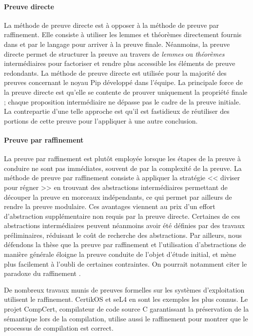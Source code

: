 			\paragraph{Preuve directe} La méthode de preuve directe est à opposer à la méthode de preuve par raffinement. Elle consiste à utiliser les lemmes et théorèmes directement fournis dans et par le langage pour arriver à la preuve finale. Néanmoins, la preuve directe permet de structurer la preuve au travers de \emph{lemmes} ou \emph{théorèmes} intermédiaires pour factoriser et rendre plus accessible les éléments de preuve redondants. La méthode de preuve directe est utilisée pour la majorité des preuves concernant le noyau Pip développé dans l'équipe. La principale force de la preuve directe est qu'elle se contente de prouver uniquement la propriété finale ; chaque proposition intermédiaire ne dépasse pas le cadre de la preuve initiale. La contrepartie d'une telle approche est qu'il est fastidieux de réutiliser des portions de cette preuve pour l'appliquer à une autre conclusion.
			
			\paragraph{Preuve par raffinement} La preuve par raffinement \cite{refinement} est plutôt employée lorsque les étapes de la preuve à conduire ne sont pas immédiates, souvent de par la complexité de la preuve. La méthode de preuve par raffinement consiste à appliquer la stratégie << diviser pour régner >> en trouvant des abstractions intermédiaires permettant de découper la preuve en morceaux indépendants, ce qui permet par ailleurs de rendre la preuve modulaire. Ces avantages viennent au prix d'un effort d'abstraction supplémentaire non requis par la preuve directe. Certaines de ces abstractions intermédiaires peuvent néanmoins avoir été définies par des travaux préliminaires, réduisant le coût de recherche des abstractions. Par ailleurs, nous défendons la thèse que la preuve par raffinement et l'utilisation d'abstractions de manière générale éloigne la preuve conduite de l'objet d'étude initial, et mène plus facilement à l'oubli de certaines contraintes. On pourrait notamment citer le paradoxe du raffinement \cite{refinementparadox, refinementparadoxsolution}.

			De nombreux travaux munis de preuves formelles sur les systèmes d'exploitation utilisent le raffinement. CertikOS et seL4 en sont les exemples les plus connus. Le projet CompCert, compilateur de code source C garantissant la préservation de la sémantique lors de la compilation, utilise aussi le raffinement pour montrer que le processus de compilation est correct.

